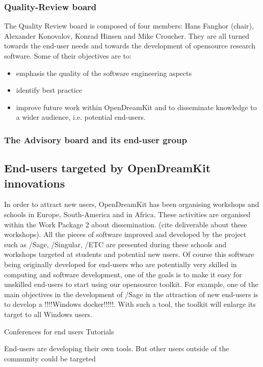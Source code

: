 \documentclass{deliverablereport}
\begin{document}
\subsubsection{Quality-Review board}

The Quality Review board is composed of four members: Hans Fanghor (chair), Alexander Konovalov, Konrad Hinsen and Mike Croucher. They are all turned towards the end-user needs and towards the development of opensource research software.
Some of their objectives are to:

\begin{itemize}
\item{emphasis the quality of the software engineering aspects}
\item{identify best practice}
\item{improve future work within OpenDreamKit and to disseminate knowledge to a wider audience, i.e. potential end-users.}
\end{itemize}
  


\subsubsection{The Advisory board and its end-user group}

\subsection{End-users targeted by OpenDreamKit innovations}



In order to attract new users, OpenDreamKit has been organising workshops and schools in Europe, South-America and in Africa. These activities are organised within the Work Package 2 about dissemination. (cite deliverable about these workshops). All the pieces of software improved and developed by the project such as /Sage, /Singular, /ETC are presented during these schools and workshops targeted at students and potential new users. Of course this software being originally developed for end-users who are potentially very skilled in computing and software development, one of the goals is to make it easy  for unskilled end-users to start using our opensource toolkit. 
For example, one of the main objectives in the development of /Sage in the attraction of new end-users is to develop a !!!!Windows docker!!!!!. With such a tool, the toolkit will enlarge its target to all Windows users. 

Conferences for end users
Tutorials


End-users are developing their own tools. But other users outside of the community could be targeted
\printbibliography
\end{document}
